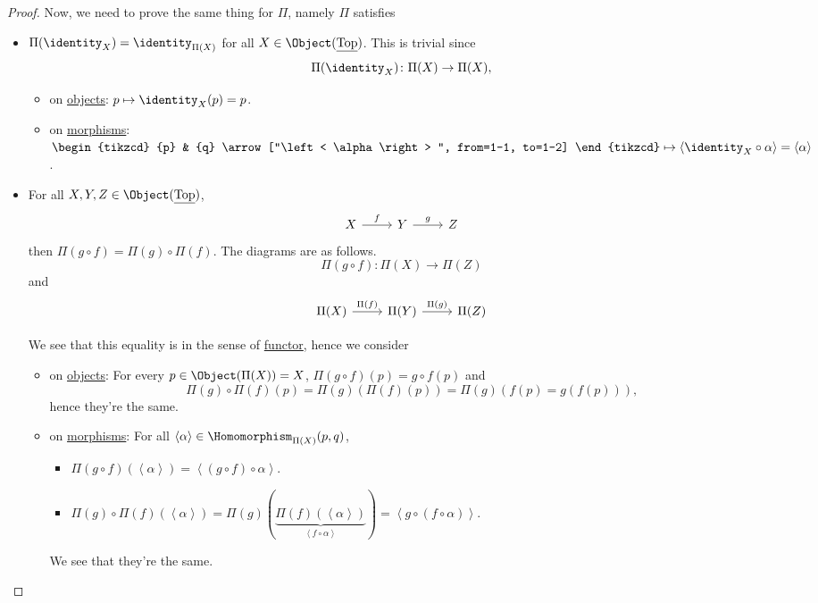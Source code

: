 \begin{proof}
	Now, we need to prove the same thing for \(\Pi\), namely \(\Pi \) satisfies
	\begin{itemize}
		\item \(\Pi (\identity_{X} ) = \identity_{\Pi (X)} \) for all \(X\in \Object (\underline{\mathrm{Top}})\). This is trivial since
		      \[
			      \Pi (\identity_{X} )\colon \Pi (X)\to \Pi (X),
		      \]
		      \begin{itemize}
			      \item on \hyperref[def:object]{objects}: \(p\mapsto \identity_{X} (p) = p\).
			      \item on \hyperref[def:morphism]{morphisms}: \(\begin{tikzcd}
				            {p} & {q}
				            \arrow["\left< \alpha  \right> ", from=1-1, to=1-2]
			            \end{tikzcd}\mapsto \left< \identity_{X} \circ \alpha  \right> = \left< \alpha  \right>  \).
		      \end{itemize}
		\item For all \(X, Y, Z\in \Object (\underline{\mathrm{Top} })\),
		      \[
			      \begin{tikzcd}
				      {X} & {Y} & {Z}
				      \arrow["f", from=1-1, to=1-2]
				      \arrow["g", from=1-2, to=1-3]
			      \end{tikzcd}
		      \]
		      then \(\Pi (g\circ f) = \Pi (g)\circ \Pi (f)\). The diagrams are as follows.
		      \[
			      \Pi (g\circ f)\colon \Pi (X)\to \Pi (Z)
		      \]
		      and
		      \[
			      \begin{tikzcd}
				      {\Pi (X)} & {\Pi (Y)} & {\Pi (Z)}
				      \arrow["\Pi (f)", from=1-1, to=1-2]
				      \arrow["\Pi (g)", from=1-2, to=1-3]
			      \end{tikzcd}
		      \]

		      We see that this equality is in the sense of \hyperref[def:functor]{functor}, hence we consider
		      \begin{itemize}
			      \item on \hyperref[def:object]{objects}: For every \(p\in \Object (\Pi (X)) = X\), \(\Pi (g\circ f)(p) = g\circ f(p)\) and
			            \[
				            \Pi (g)\circ \Pi (f)(p) = \Pi (g)(\Pi (f)(p))=\Pi (g)(f(p)=g(f(p))),
			            \]
			            hence they're the same.
			      \item on \hyperref[def:morphism]{morphisms}: For all \(\left< \alpha  \right> \in \Homomorphism _{\Pi (X)}(p, q)\),
			            \begin{itemize}
				            \item \(\Pi (g\circ f)(\left< \alpha  \right> ) = \left< (g\circ f)\circ \alpha  \right> \).
				            \item \(\Pi (g)\circ \Pi (f)(\left< \alpha  \right> ) = \Pi (g)\left(\underbrace{\Pi (f)(\left< \alpha  \right> )}_{\left< f\circ \alpha  \right> }\right) = \left< g\circ \left(f\circ \alpha \right) \right> \).
			            \end{itemize}
			            We see that they're the same.
		      \end{itemize}
	\end{itemize}
\end{proof}